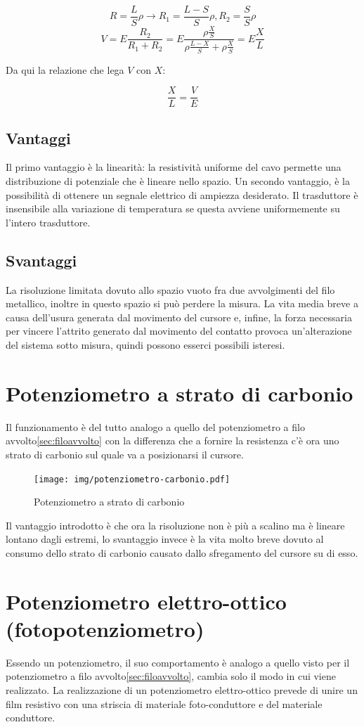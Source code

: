\[ R = \frac{L}{S}\rho \rightarrow R_1=\frac{L-S}{S}\rho,
R_2=\frac{S}{S}\rho \]
\[V=E\frac{R_2}{R_1+R_2}=E\frac{\rho\frac{X}{S}}{\rho\frac{L-X}{S}
+ \rho\frac{X}{S}}= E \frac{X}{L}\]

Da qui la relazione che lega $V$ con $X$:

	\[\frac{X}{L} = \frac{V}{E}\]

\subsection{Vantaggi}
Il primo vantaggio è la linearità: la resistività uniforme del cavo
permette una distribuzione di potenziale che è lineare nello spazio.
Un secondo vantaggio, è la possibilità di ottenere un segnale
elettrico di ampiezza desiderato. Il trasduttore è insensibile alla
variazione di temperatura se questa avviene uniformemente su l'intero
trasduttore.
\subsection{Svantaggi}
La risoluzione limitata dovuto allo spazio vuoto fra due avvolgimenti
del filo metallico, inoltre in questo spazio si può perdere la misura.
La vita media breve a causa dell'usura generata dal movimento del
cursore e, infine, la forza necessaria per vincere l'attrito generato
dal movimento del contatto provoca un'alterazione del sistema sotto
misura, quindi possono esserci possibili isteresi.

\section{Potenziometro a strato di carbonio}\label{sec:potcarbonio}
Il funzionamento è del tutto analogo a quello del potenziometro a filo
avvolto\ref{sec:filoavvolto} con la differenza che a fornire la
resistenza c'è ora uno strato di carbonio sul quale va a posizionarsi
il cursore.

\begin{figure}[htbp]
	\centering
	\texttt{[image: img/potenziometro-carbonio.pdf]}
	\caption{Potenziometro a
strato di carbonio\label{fig:potenziometro-carbonio}}
\end{figure}

Il vantaggio introdotto è che ora la risoluzione non è più
a scalino ma è lineare lontano dagli estremi, lo svantaggio invece è
la vita molto breve dovuto al consumo dello strato di carbonio causato
dallo sfregamento del cursore su di esso.

\section{Potenziometro elettro-ottico
(fotopotenziometro)}\label{sec:elettrottico}
Essendo un potenziometro, il suo comportamento è analogo a quello
visto per il potenziometro a filo avvolto\ref{sec:filoavvolto}, cambia
solo il modo in cui viene realizzato. La realizzazione di un
potenziometro elettro-ottico prevede di unire un film resistivo con
una striscia di materiale foto-conduttore e del materiale conduttore.

